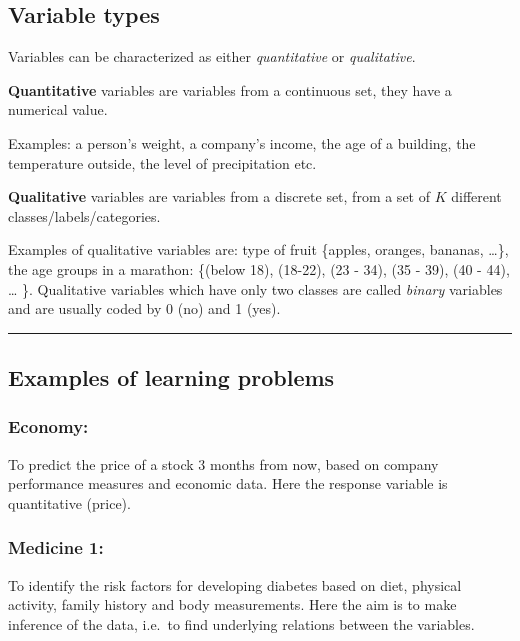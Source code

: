\documentclass[]{article}
\begin{document}
\hypertarget{variable-types}{%
\subsection{Variable types}\label{variable-types}}

Variables can be characterized as either \emph{quantitative} or
\emph{qualitative}.

\textbf{Quantitative} variables are variables from a continuous set,
they have a numerical value.

Examples: a person's weight, a company's income, the age of a building,
the temperature outside, the level of precipitation etc.

\textbf{Qualitative} variables are variables from a discrete set, from a
set of \(K\) different classes/labels/categories.

Examples of qualitative variables are: type of fruit \{apples, oranges,
bananas, \ldots{}\}, the age groups in a marathon: \{(below 18),
(18-22), (23 - 34), (35 - 39), (40 - 44), \ldots{} \}. Qualitative
variables which have only two classes are called \emph{binary} variables
and are usually coded by 0 (no) and 1 (yes).

\begin{center}\rule{0.5\linewidth}{\linethickness}\end{center}

\hypertarget{examples-of-learning-problems}{%
\subsection{Examples of learning
problems}\label{examples-of-learning-problems}}

\hypertarget{economy}{%
\subsubsection{Economy:}\label{economy}}

To predict the price of a stock 3 months from now, based on company
performance measures and economic data. Here the response variable is
quantitative (price).

\hypertarget{medicine-1}{%
\subsubsection{Medicine 1:}\label{medicine-1}}

To identify the risk factors for developing diabetes based on diet,
physical activity, family history and body measurements. Here the aim is
to make inference of the data, i.e.~to find underlying relations between
the variables.
\end{document}
